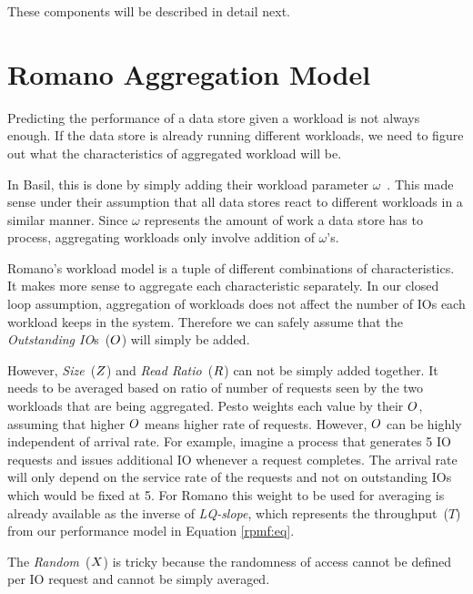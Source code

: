 These components will be described in detail next.

\section{Romano Aggregation Model}
Predicting the performance of a data store given a workload is not always enough.
If the data store is already running different workloads, we need to figure out what the characteristics of aggregated workload will be.

In Basil, this is done by simply adding their workload parameter $\omega$~\cite{gulati:2011}.
This made sense under their assumption that all data stores react to different workloads in a similar manner.
Since $\omega$ represents the amount of work a data store has to process, aggregating workloads only involve addition of $\omega$'s.

Romano's workload model is a tuple of different combinations of characteristics.
It makes more sense to aggregate each characteristic separately.
In our closed loop assumption, aggregation of workloads does not affect the number of IOs each workload keeps in the system.
Therefore we can safely assume that the \emph{Outstanding IO}s~($O$) will simply be added.

However, \emph{Size}~($Z$) and \emph{Read Ratio}~($R$) can not be simply added together.
It needs to be averaged based on ratio of number of requests seen by the two workloads that are being aggregated.
Pesto weights each value by their $O$, assuming that higher $O$ means higher rate of requests.
However, $O$ can be highly independent of arrival rate.
For example, imagine a process that generates 5 IO requests and issues additional IO whenever a request completes.
The arrival rate will only depend on the service rate of the requests and not on outstanding IOs which would be fixed at 5.
For Romano this weight to be used for averaging is already available as the inverse of \emph{LQ-slope}, which represents the throughput~($T$) from our performance model in Equation \ref{rpmf:eq}.

The \emph{Random}~($X$) is tricky because the randomness of access cannot be defined per IO request and cannot be simply averaged.

